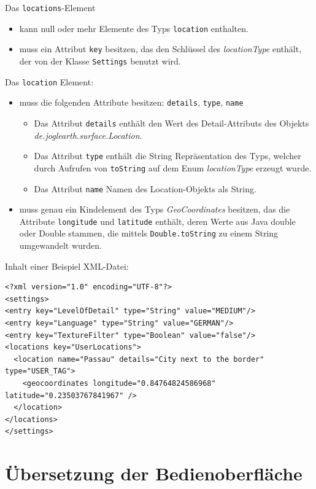 \documentclass[10pt]{scrreprt}
\begin{document}
 Das \texttt{locations}-Element
\begin{itemize}
 \item kann null oder mehr Elemente des Typs \texttt{location} enthalten.
 \item muss ein Attribut \texttt{key} besitzen, das den Schlüssel des \textit{locationType} enthält, der von der Klasse \texttt{Settings} benutzt wird.
\end{itemize}

 Das \texttt{location} Element:
\begin{itemize}
 \item muss die folgenden Attribute besitzen: \texttt{details}, \texttt{type}, \texttt{name}
 \begin{itemize}
  \item Das Attribut \texttt{details} enthält den Wert des Detail-Attributs des Objekts \textit{de.joglearth.surface.Location}.
  \item Das Attribut \texttt{type} enthält die String Repräsentation des Typs, welcher durch Aufrufen von \texttt{toString} auf dem Enum \textit{locationType} erzeugt wurde.
  \item Das Attribut \texttt{name} Namen des Location-Objekts als String.
  \end{itemize}
 \item muss genau ein Kindelement des Typs \textit{GeoCoordinates} besitzen, das die Attribute \texttt{longitude} und \texttt{latitude} enthält, deren Werte aus Java double oder Double stammen, die mittels \texttt{Double.toString} zu einem String umgewandelt wurden.
\end{itemize}
\newpage
Inhalt einer Beispiel XML-Datei:
\lstset{language=XML}
\begin{lstlisting}[frame=single]
<?xml version="1.0" encoding="UTF-8"?>
<settings>
<entry key="LevelOfDetail" type="String" value="MEDIUM"/>
<entry key="Language" type="String" value="GERMAN"/>
<entry key="TextureFilter" type="Boolean" value="false"/>
<locations key="UserLocations">
  <location name="Passau" details="City next to the border" type="USER_TAG">
    <geocoordinates longitude="0.84764824586968" latitude="0.23503767841967" />
  </location>
</locations>
</settings>
\end{lstlisting}


\chapter{Übersetzung der Bedienoberfläche}
\end{document}
